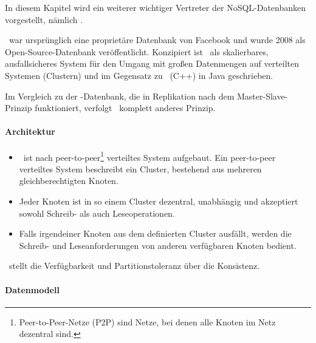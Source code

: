 In diesem Kapitel wird ein weiterer wichtiger Vertreter der NoSQL-Datenbanken vorgestellt, nämlich \cass.

\cass\ war ursprünglich eine proprietäre Datenbank von Facebook und wurde 2008 als Open-Source-Datenbank veröffentlicht. Konzipiert ist \cass\ als skalierbares, ausfallsicheres System für den Umgang mit großen Datenmengen auf verteilten Systemen (Clustern) und im Gegensatz zu \mongo\ (C++) in Java geschrieben.


Im Vergleich zu der \mongo-Datenbank, die in Replikation nach dem Master-Slave-Prinzip funktioniert, verfolgt \cass\ komplett anderes Prinzip. %

\paragraph{Architektur}

\begin{itemize}
\item \cass\ ist nach peer-to-peer\footnote{Peer-to-Peer-Netze (P2P) sind Netze, bei denen alle Knoten im Netz dezentral sind.} verteiltes System aufgebaut. Ein peer-to-peer verteiltes System beschreibt ein Cluster, bestehend aus mehreren gleichberechtigten Knoten.  
\item Jeder Knoten ist in so einem Cluster dezentral, unabhängig und akzeptiert sowohl Schreib- als auch Leseoperationen.
\item Falls irgendeiner Knoten aus dem definierten Cluster ausfällt, werden die Schreib- und Leseanforderungen von anderen verfügbaren Knoten bedient.
\end{itemize}
\cass\ stellt die Verfügbarkeit und Partitionstoleranz über die Konsistenz.

\paragraph{Datenmodell}

